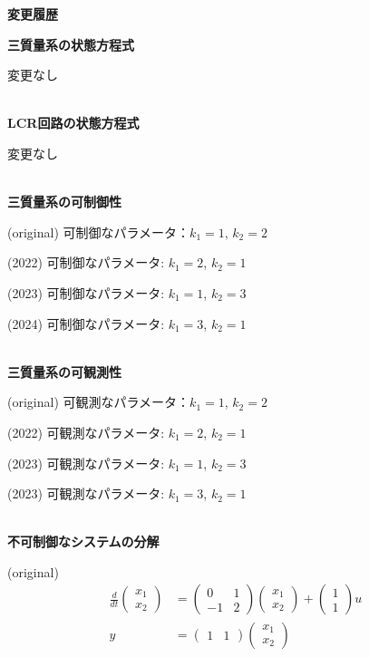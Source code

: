 \documentclass[a4paper,11pt,fleqn]{jreport}
\begin{document}
\begin{center}
	{\Large \bf 変更履歴}
\end{center}
	

\noindent
{\bf 三質量系の状態方程式}

変更なし

\ \\ \noindent
{\bf LCR回路の状態方程式}

変更なし

\ \\ \noindent
{\bf 三質量系の可制御性}

(original) 可制御なパラメータ：$k_1=1$, $k_2=2$

(2022) 可制御なパラメータ:{\color{red} $k_1=2$, $k_2=1$}

(2023) 可制御なパラメータ:{\color{red} $k_1=1$, $k_2=3$}

(2024) 可制御なパラメータ:{\color{red} $k_1=3$, $k_2=1$}

\ \\ \noindent
{\bf 三質量系の可観測性}

(original) 可観測なパラメータ：$k_1=1$, $k_2=2$

(2022) 可観測なパラメータ:{\color{red} $k_1=2$, $k_2=1$}

(2023) 可観測なパラメータ:{\color{red} $k_1=1$, $k_2=3$}

(2023) 可観測なパラメータ:{\color{red} $k_1=3$, $k_2=1$}

\ \\ \noindent
{\bf 不可制御なシステムの分解}

(original)
\begin{align*}
	\frac{d}{dt}
	\left (
	\begin{array}{c}
	 x_1 \\ x_2 
	\end{array}
	\right )
	& = 
	\left (
	\begin{array}{cc}
	 0 & 1 \\
	 -1 & 2
	\end{array}
	\right )
	\left (
	\begin{array}{c}
	 x_1 \\ x_2 
	\end{array}
	\right )
	+
	\left (
	\begin{array}{c}
	 1 \\ 1 
	\end{array}
	\right )
	u
\\
	y 
	&=
	\left (
	\begin{array}{cc}
	 1 & 1  
	\end{array}
	\right )
	\left (
	\begin{array}{c}
	 x_1 \\ x_2 
	\end{array}
	\right )
\end{align*}
\end{document}

